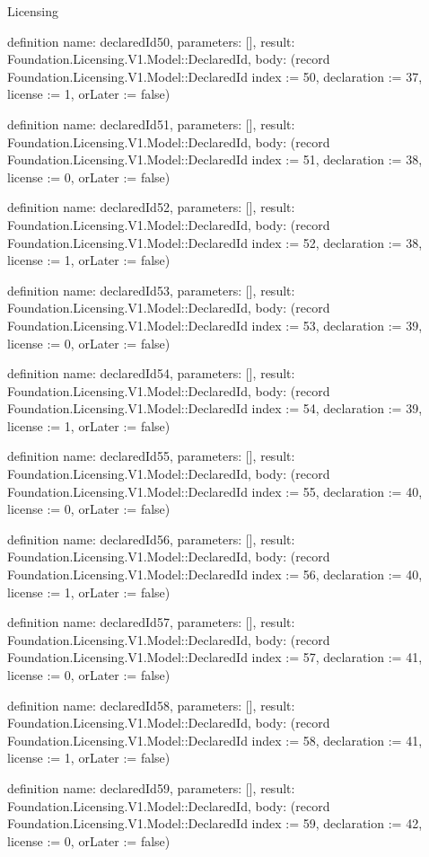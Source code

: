 \begin{lexlean}{Licensing}
\begin{semanticmodule}
definition{
  name: declaredId50,
  parameters: [],
  result: Foundation.Licensing.V1.Model::DeclaredId,
  body: (record Foundation.Licensing.V1.Model::DeclaredId {index := 50, declaration := 37, license := 1, orLater := false})
}

definition{
  name: declaredId51,
  parameters: [],
  result: Foundation.Licensing.V1.Model::DeclaredId,
  body: (record Foundation.Licensing.V1.Model::DeclaredId {index := 51, declaration := 38, license := 0, orLater := false})
}

definition{
  name: declaredId52,
  parameters: [],
  result: Foundation.Licensing.V1.Model::DeclaredId,
  body: (record Foundation.Licensing.V1.Model::DeclaredId {index := 52, declaration := 38, license := 1, orLater := false})
}

definition{
  name: declaredId53,
  parameters: [],
  result: Foundation.Licensing.V1.Model::DeclaredId,
  body: (record Foundation.Licensing.V1.Model::DeclaredId {index := 53, declaration := 39, license := 0, orLater := false})
}

definition{
  name: declaredId54,
  parameters: [],
  result: Foundation.Licensing.V1.Model::DeclaredId,
  body: (record Foundation.Licensing.V1.Model::DeclaredId {index := 54, declaration := 39, license := 1, orLater := false})
}

definition{
  name: declaredId55,
  parameters: [],
  result: Foundation.Licensing.V1.Model::DeclaredId,
  body: (record Foundation.Licensing.V1.Model::DeclaredId {index := 55, declaration := 40, license := 0, orLater := false})
}

definition{
  name: declaredId56,
  parameters: [],
  result: Foundation.Licensing.V1.Model::DeclaredId,
  body: (record Foundation.Licensing.V1.Model::DeclaredId {index := 56, declaration := 40, license := 1, orLater := false})
}

definition{
  name: declaredId57,
  parameters: [],
  result: Foundation.Licensing.V1.Model::DeclaredId,
  body: (record Foundation.Licensing.V1.Model::DeclaredId {index := 57, declaration := 41, license := 0, orLater := false})
}

definition{
  name: declaredId58,
  parameters: [],
  result: Foundation.Licensing.V1.Model::DeclaredId,
  body: (record Foundation.Licensing.V1.Model::DeclaredId {index := 58, declaration := 41, license := 1, orLater := false})
}

definition{
  name: declaredId59,
  parameters: [],
  result: Foundation.Licensing.V1.Model::DeclaredId,
  body: (record Foundation.Licensing.V1.Model::DeclaredId {index := 59, declaration := 42, license := 0, orLater := false})
}


\end{semanticmodule}
\end{lexlean}
